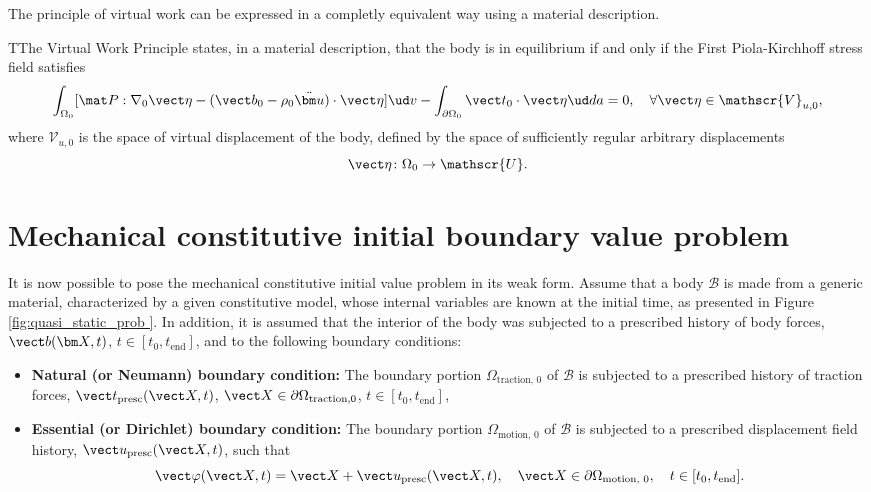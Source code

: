 The principle of virtual work can be expressed in a completly equivalent way using a material description.
\begin{problem}
TThe Virtual Work Principle states, in a material description, that the body is in equilibrium if and only if the First Piola-Kirchhoff stress field satisfies
    \begin{equation}
        \int_{\Omega_0} [\mat P:\nabla_0 \vect \eta - (\vect b_0 - \rho_0 \ddot{\bm u})\cdot \vect \eta]\ud v - \int_{\partial\Omega_0} \vect t_0\cdot \vect \eta\ud da = 0,\quad \forall \vect \eta \in \mathscr{V}_{u,0},
    \end{equation}
 where $\mathscr{V}_{u,0}$ is the space of virtual displacement of the body, defined by the space of sufficiently regular arbitrary displacements
 \begin{equation}
     \vect \eta\colon \Omega_0\to \mathscr{U}.
 \end{equation}
\end{problem}

\section{Mechanical constitutive initial boundary value problem} \label{sec:mechanical_constitutive_problem}

It is now possible to pose the mechanical constitutive initial value problem in its weak form.
Assume that a body $\mathscr{B}$ is made from a generic material, characterized by a given constitutive model, whose internal variables are known at the initial time, as presented in Figure \ref{fig:quasi_static_prob }.
In addition, it is assumed that the interior of the body was subjected to a prescribed history of body forces, $\vect b(\bm X, t)$, $t\in[t_0, t_\text{end}]$, and to the following boundary conditions:
\begin{itemize}
    \item \textbf{Natural (or Neumann) boundary condition:}
    The boundary portion $\Omega_\text{traction, 0}$ of $\mathscr{B}$ is subjected to a prescribed history of traction forces, $\vect t_\text{presc}(\vect X, t)$, $\vect X\in \partial \Omega_\text{traction,0}$, $t\in[t_0, t_\text{end}]$,\\
    \item \textbf{Essential (or Dirichlet) boundary condition:}
    The boundary portion $\Omega_\text{motion, 0}$ of $\mathscr{B}$ is subjected to a prescribed displacement field history, $\vect u_\text{presc}(\vect X, t)$, such that $$\vect \varphi(\vect X, t) = \vect X + \vect u_\text{presc}(\vect X, t),\quad \vect X\in \partial\Omega_\text{motion, 0},\quad t\in[t_0, t_\text{end}].$$
\end{itemize}


